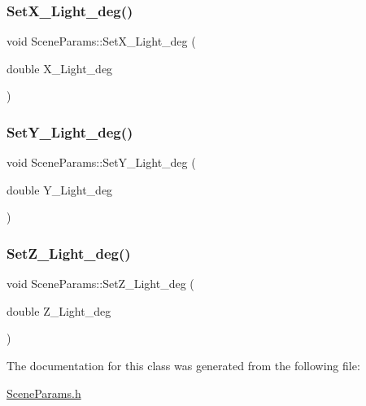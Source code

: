 \mbox{\label{class_scene_params_aeb3e8e5aed5f1bbe09d7fac60efc3aef}} 
\subsubsection{\texorpdfstring{Set\+X\+\_\+\+Light\+\_\+deg()}{SetX\_Light\_deg()}}
{\footnotesize\ttfamily void Scene\+Params\+::\+Set\+X\+\_\+\+Light\+\_\+deg (\begin{DoxyParamCaption}\item[{double}]{X\+\_\+\+Light\+\_\+deg }\end{DoxyParamCaption})\hspace{0.3cm}{\ttfamily [inline]}}

\mbox{\label{class_scene_params_a41860a090d574d8db5a723f2c9b10b0e}} 
\subsubsection{\texorpdfstring{Set\+Y\+\_\+\+Light\+\_\+deg()}{SetY\_Light\_deg()}}
{\footnotesize\ttfamily void Scene\+Params\+::\+Set\+Y\+\_\+\+Light\+\_\+deg (\begin{DoxyParamCaption}\item[{double}]{Y\+\_\+\+Light\+\_\+deg }\end{DoxyParamCaption})\hspace{0.3cm}{\ttfamily [inline]}}

\mbox{\label{class_scene_params_a6052a5579c94fce2b6342b073c7cd482}} 
\subsubsection{\texorpdfstring{Set\+Z\+\_\+\+Light\+\_\+deg()}{SetZ\_Light\_deg()}}
{\footnotesize\ttfamily void Scene\+Params\+::\+Set\+Z\+\_\+\+Light\+\_\+deg (\begin{DoxyParamCaption}\item[{double}]{Z\+\_\+\+Light\+\_\+deg }\end{DoxyParamCaption})\hspace{0.3cm}{\ttfamily [inline]}}



The documentation for this class was generated from the following file\+:\begin{DoxyCompactItemize}
\item 
\hyperlink{_scene_params_8h}{Scene\+Params.\+h}\end{DoxyCompactItemize}
